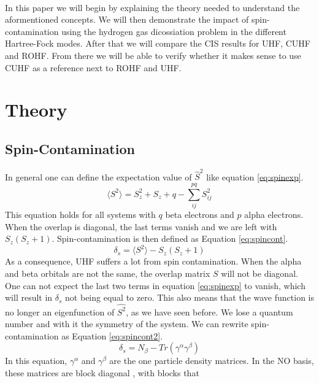 \documentclass[twoside,twocolumn,9pt]{article}
\begin{document}
\paragraph*{}
In this paper we will begin by explaining the theory needed to understand the aformentioned concepts. We will then demonstrate the impact of spin-contamination using the hydrogen gas
dicossiation problem in the different Hartree-Fock modes. After that we will compare the CIS results for UHF, CUHF and ROHF. From there we will be able to verify whether it makes
sense to use CUHF as a reference next to ROHF and UHF. 


\section{Theory}

\subsection{Spin-Contamination}
In general one can define the expectation value of $\hat{S}^2$ like equation \eqref{eq:spinexp}\cite{Andrews1991}.
\begin{equation}\label{eq:spinexp}
    \langle S^2 \rangle = S_z^2 + S_z + q - \sum_{ij}^{pq} S_{ij}^2
\end{equation}
This equation holds for all systems with $q$ beta electrons and $p$ alpha electrons. When the overlap is diagonal, the last terms vanish and we are left with $S_z(S_z + 1)$. 
Spin-contamination is then defined as Equation \eqref{eq:spincont}.
\begin{equation}\label{eq:spincont}
    \delta_s = \langle S^2 \rangle - S_z(S_z + 1)
\end{equation}
As a consequence, UHF suffers a lot from spin contamination. When the alpha and beta orbitals are not the same, the overlap matrix $S$ will not be diagonal. One can not expect the 
last two terms in equation \eqref{eq:spinexp} to vanish, which will result in $\delta_s$ not being equal to zero. This also means that the wave function is no longer an eigenfunction 
of $\hat{S^2}$, as we have seen before. We lose a quantum number and with it the symmetry of the system. We can rewrite spin-contamination as Equation \eqref{eq:spincont2}\cite{Savin2010}.
\begin{equation}\label{eq:spincont2}
    \delta_s = N_\beta - Tr(\gamma^\alpha\gamma^\beta)
\end{equation}
In this equation, $\gamma^{\alpha}$ and $\gamma^\beta$ are the one particle density matrices. In the NO basis, these matrices are block diagonal \cite{Scuseria2010}, with blocks that
\end{document}
